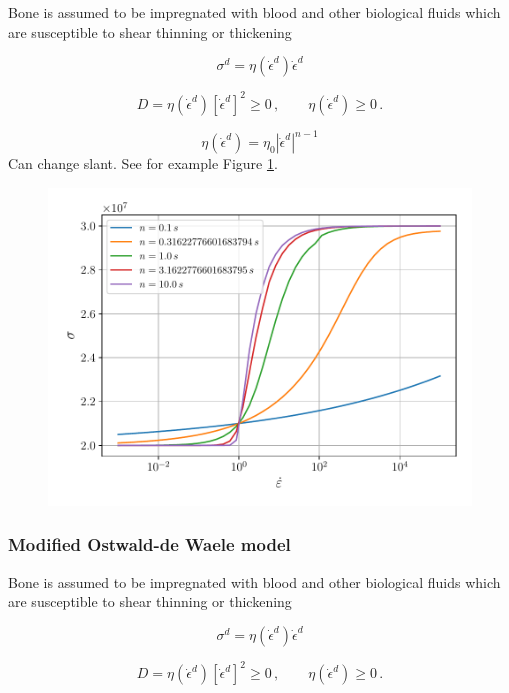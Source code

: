 \documentclass[12pt]{article}
\begin{document}
Bone is assumed to be impregnated with blood and other biological fluids which are susceptible to shear thinning or thickening

\begin{equation}
\sigma^{d} = \eta(\dot{\epsilon}^{d})\dot{\epsilon}^{d}
\end{equation}

\begin{equation}
D = \eta(\dot{\epsilon}^{d})\left[\dot{\epsilon}^{d}\right]^{2} \geq 0 \,, \qquad \eta(\dot{\epsilon}^{d})\geq 0\,.
\end{equation}

\begin{equation}
\eta(\dot{\epsilon}^{d}) = \eta_{0} |\dot{\epsilon}^{d}|^{n-1}
\end{equation}
Can change slant. See for example Figure \ref{fig:odw}.
\begin{figure}[!htb]
	\centering
	\includegraphics[width=0.65\linewidth]{odw}
	\caption{ }
	\label{fig:odw}	
\end{figure}

\subsubsection{Modified Ostwald-de Waele model}

Bone is assumed to be impregnated with blood and other biological fluids which are susceptible to shear thinning or thickening

\begin{equation}
\sigma^{d} = \eta(\dot{\epsilon}^{d})\dot{\epsilon}^{d}
\end{equation}

\begin{equation}
D = \eta(\dot{\epsilon}^{d})\left[\dot{\epsilon}^{d}\right]^{2} \geq 0 \,, \qquad \eta(\dot{\epsilon}^{d})\geq 0\,.
\end{equation}
\end{document}
